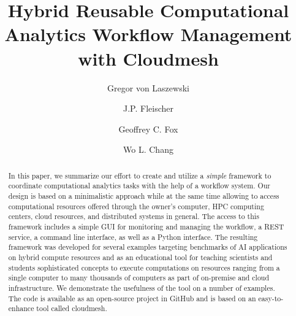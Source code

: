 \title{Hybrid Reusable Computational Analytics Workflow Management with Cloudmesh}

% 

\author{Gregor von Laszewski}

\author{J.P. Fleischer}

\author{Geoffrey C. Fox}

\author{Wo L. Chang}

\renewcommand{\shortauthors}{von Laszewski, et al.}

\begin{abstract}

% 


In this paper, we summarize our effort to create and utilize a {\em simple} framework to coordinate computational analytics tasks with the help of a workflow system. Our design is based on a minimalistic approach while at the same time allowing to access computational resources offered through the owner's computer, HPC computing centers, cloud resources, and distributed systems in general. The access to this framework includes a simple GUI for monitoring and managing the workflow, a REST service, a command line interface, as well as a Python interface. The resulting framework was developed for several examples targeting benchmarks of AI applications on hybrid compute resources and as an educational tool for teaching scientists and students sophisticated concepts to execute computations on resources ranging from a single computer to many thousands of computers as part of on-premise and cloud infrastructure. We demonstrate the usefulness of the tool on a number of examples. The code is available as an open-source project in GitHub and is based on an easy-to-enhance tool called cloudmesh.
\end{abstract}


